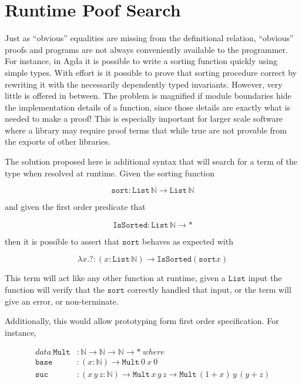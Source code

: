 
\section{Runtime Poof Search}

Just as ``obvious'' equalities are missing from the definitional relation, ``obvious'' proofs and programs are not always conveniently available to the programmer.
For instance, in Agda it is possible to write a sorting function quickly using simple types.
With effort is it possible to prove that sorting procedure correct by rewriting it with the necessarily dependently typed invariants.
However, very little is offered in between.
The problem is magnified if module boundaries hide the implementation details of a function, since those details are exactly what is needed to make a proof!
This is especially important for larger scale software where a library may require proof terms that while true are not provable from the exports of other libraries.

The solution proposed here is additional syntax that will search for a term of the type when resolved at runtime.
Given the sorting function 

\[
\mathtt{sort}:\mathtt{List}\,\mathbb{N}\rightarrow\mathtt{List}\,\mathbb{N}
\]

and given the first order predicate that 

\[
\mathtt{IsSorted}:\mathtt{List}\,\mathbb{N}\rightarrow*
\]

then it is possible to assert that $\mathtt{sort}$ behaves as expected with

\[
\lambda x.?:\left(x:\mathtt{List}\,\mathbb{N}\right)\rightarrow\mathtt{IsSorted}\left(\mathtt{sort}x\right)
\]

This term will act like any other function at runtime, given a $\mathtt{List}$ input the function will verify that the $\mathtt{sort}$ correctly handled that input, or the term will give an error, or non-terminate.

Additionally, this would allow prototyping form first order specification.
For instance,

\begin{align*}
data\ \mathtt{Mult} & :\mathbb{N}\rightarrow\mathbb{N}\rightarrow\mathbb{N}\rightarrow*\ where\\
\mathtt{base} & :\left(x:\mathbb{N}\right)\rightarrow\mathtt{Mult}\ 0\ x\ 0\\
\mathtt{suc} & :\left(x\,y\,z:\mathbb{N}\right)\rightarrow\mathtt{Mult}\,x\,y\,z\rightarrow\mathtt{Mult}\,\left(1+x\right)\,y\,(y+z)
\end{align*}


